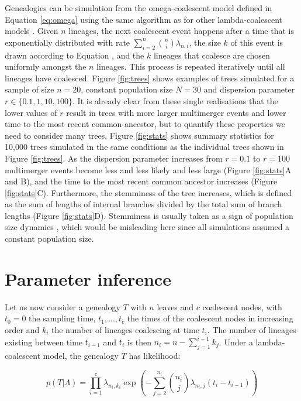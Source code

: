 \documentclass{article}
\begin{document}
Genealogies can be simulation from the omega-coalescent model 
defined in Equation \ref{eq:omega} using the same algorithm
as for other lambda-coalescent models \citep{pitmanCoalescentsMultipleCollisions1999}.
Given $n$ lineages, the next coalescent event happens after a time that is 
exponentially distributed with rate $\sum_{i=2}^n \binom{n}{i}\lambda_{n,i}$,
the size $k$ of this event is drawn according to Equation ,
and the $k$ lineages that coalesce are chosen uniformly amongst the $n$ lineages.
This process is repeated iteratively until all lineages have coalesced.
Figure \ref{fig:trees} shows examples of trees simulated for a sample of size $n=20$,
constant population size $N=30$ and dispersion parameter $r \in \{0.1,1,10,100\}$. 
It is already clear from these single realisations that the lower values of $r$ result
in trees with more larger multimerger events and lower time to the most recent common ancestor,
but to quantify these properties we need to consider many trees.
Figure \ref{fig:stats} shows summary statistics for 10,000 trees simulated in the same conditions
as the individual trees shown in Figure \ref{fig:trees}. 
As the dispersion parameter increases from $r=0.1$
to $r=100$ multimerger events become less and less likely and less large
(Figure \ref{fig:stats}A and B), and the 
time to the most recent common ancestor increases
(Figure \ref{fig:stats}C).
Furthermore, the stemminess of the tree increases, 
which is defined as the sum of lengths of internal branches divided by the total sum of branch lengths (Figure \ref{fig:stats}D). 
Stemminess is usually taken as a sign of population size dynamics
\citep{fialaFactorsDeterminingAccuracy1985,Didelot2009d},
which would be misleading here since all simulations assumed
a constant population size.


\section{Parameter inference}

Let us now consider a genealogy $T$ with $n$ leaves and $c$ coalescent nodes, with $t_0=0$ the
sampling time,
$t_1,...,t_c$ the times of the coalescent nodes in increasing order and $k_i$ the number
of lineages coalescing at time $t_i$. The number of lineages existing between
time $t_{i-1}$ and $t_i$ is then $n_i=n-\sum_{j=1}^{i-1} k_j$.
Under a lambda-coalescent model, the genealogy $T$ has likelihood:

\begin{equation}
p(T|\Lambda)=\prod_{i=1}^{c}\lambda_{n_i,k_i}\exp\left(-\sum_{j=2}^{n_i}\binom{n_i}{j}\lambda_{n_i,j}(t_i-t_{i-1})\right)
\label{eq:likelihood}
\end{equation}
\end{document}
